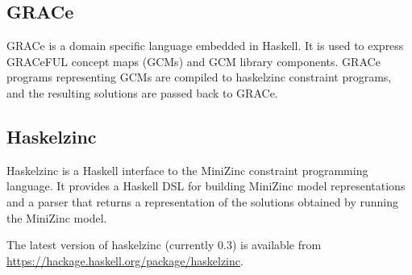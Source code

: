 \subsection*{GRACe}

GRACe is a domain specific language embedded in Haskell.
%
It is used to express GRACeFUL concept maps (GCMs) and GCM library
components.
%
GRACe programs representing GCMs are compiled to haskelzinc constraint
programs, and the resulting solutions are passed back to GRACe.

\subsection*{Haskelzinc}

Haskelzinc is a Haskell interface to the MiniZinc constraint
programming language.
%
It provides a Haskell DSL for building MiniZinc model representations and a parser that returns a representation of the solutions obtained
by running the MiniZinc model.

The latest version of haskelzinc (currently 0.3) is available from
\url{https://hackage.haskell.org/package/haskelzinc}.

